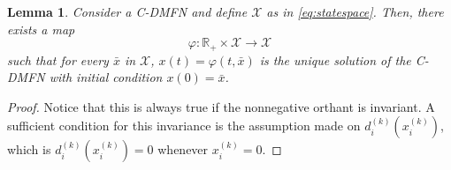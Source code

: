 \documentclass[10pt,a4paper]{amsart}
\newtheorem{lemma}{Lemma}
\newcommand{\R}{\mathbb{R}}
\newcommand{\ben}{\begin{equation*}}
\newcommand{\een}{\end{equation*}}
\newcommand{\mc}{\mathcal}
\begin{document}
\begin{lemma}
	Consider a C-DMFN and define $\mc{X}$ as in \eqref{eq:statespace}. Then, there exists a map
	\ben
	\varphi : \R_+ \times \mc{X} \rightarrow \mc{X}
	\een
	such that for every $\bar{x}$ in $\mc{X}$, $x(t) = \varphi(t,\bar{x})$ is the unique solution of the C-DMFN with initial condition $x(0) = \bar{x}$.
\end{lemma}

\begin{proof}
	Notice that this is always true if the nonnegative orthant is invariant. A sufficient condition for this invariance is the assumption made on $d_i^{(k)}(x_i^{(k)})$, which is $d_i^{(k)}(x_i^{(k)}) = 0$ whenever $x_i^{(k)} = 0$.
\end{proof}
\end{document}
